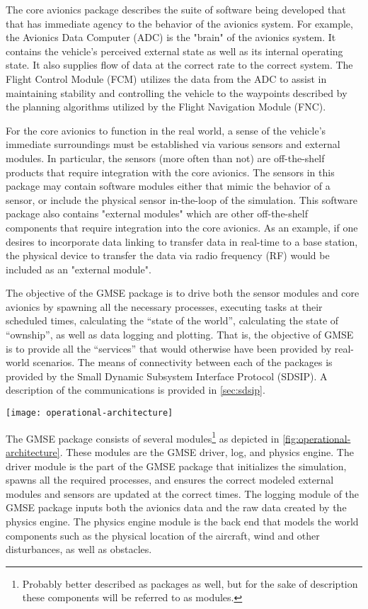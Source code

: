 The core avionics package describes the suite of software being developed that that has immediate
agency to the behavior of the avionics system. For example, the Avionics Data Computer (ADC) is the
"brain" of the avionics system. It contains the vehicle's perceived external state as well as its
internal operating state. It also supplies flow of data at the correct rate to the correct system.
The Flight Control Module (FCM) utilizes the data from the ADC to assist in maintaining stability
and controlling the vehicle to the waypoints described by the planning algorithms utilized by the
Flight Navigation Module (FNC).

For the core avionics to function in the real world, a sense of the vehicle's immediate surroundings
must be established via various sensors and external modules. In particular, the sensors (more often
than not) are off-the-shelf products that require integration with the core avionics. The sensors in
this package may contain software modules either that mimic the behavior of a sensor, or include the
physical sensor in-the-loop of the simulation. This software package also contains "external
modules" which are other off-the-shelf components that require integration into the core avionics.
As an example, if one desires to incorporate data linking to transfer data in real-time to a base
station, the physical device to transfer the data via radio frequency (RF) would be included as an
"external module".

The objective of the GMSE package is to drive both the sensor modules and core avionics by spawning
all the necessary processes, executing tasks at their scheduled times, calculating the ``state of
the world'', calculating the state of ``ownship'', as well as data logging and plotting. That is,
the objective of GMSE is to provide all the ``services'' that would otherwise have been provided by
real-world scenarios. The means of connectivity between each of the packages is provided by the
Small Dynamic Subsystem Interface Protocol (SDSIP). A description of the communications is provided
in \autoref{sec:sdsip}.

\begin{figure*}[ht]
\texttt{[image: operational-architecture]}
\caption{}
\label{fig:operational-architecture}
\end{figure*}

The GMSE package consists of several modules\footnote{Probably better described as packages as well,
but for the sake of description these components will be referred to as modules.} as depicted in
\autoref{fig:operational-architecture}. These modules are the GMSE driver, log, and physics engine.
The driver module is the part of the GMSE package that initializes the simulation, spawns all the
required processes, and ensures the correct modeled external modules and sensors are updated at the
correct times. The logging module of the GMSE package inputs both the avionics data and the raw data
created by the physics engine. The physics engine module is the back end that models the world
components such as the physical location of the aircraft, wind and other disturbances, as well as
obstacles.

